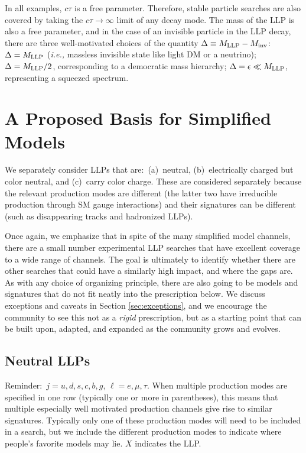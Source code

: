 In all examples, $c\tau$ is a free parameter. Therefore, stable particle searches are also covered by taking the $c\tau\rightarrow\infty$ limit of any decay mode. The mass of the LLP is also a free parameter, and in the case of an invisible particle in the LLP decay, there are three well-motivated choices of the quantity $\Delta\equiv M_{\rm LLP}-M_{\rm inv}$:~$\Delta=M_{\rm LLP}$ (\emph{i.e.,} massless invisible state like light DM or a neutrino); $\Delta=M_{\rm LLP}/2$, corresponding to a democratic mass hierarchy; $\Delta=\epsilon \ll M_{\rm LLP}$, representing a squeezed spectrum.

\section{A Proposed Basis for Simplified Models}

We separately consider LLPs that are:~(a)~neutral, (b)~electrically charged but color neutral, and (c)~carry color charge. These are considered separately because the relevant production modes are different (the latter two have irreducible production through SM gauge interactions) and their signatures can be different (such as disappearing tracks and hadronized LLPs).

Once again, we emphasize that in spite of the many simplified model channels, there are a small number experimental LLP searches that have excellent coverage to a wide range of channels. The goal is ultimately to identify whether there are other searches that could have a similarly high impact, and where the gaps are. As with any choice of organizing principle, there are also going to be models and signatures that do not fit neatly into the prescription below. We discuss exceptions and caveats in Section \ref{sec:exceptions}, and we encourage the community to see this not as a \emph{rigid} prescription, but as a starting point that can be built upon, adapted, and expanded as the community grows and evolves.

\subsection{Neutral LLPs}

Reminder:~$j=u,d,s,c,b,g$, $\ell=e,\mu,\tau$.
When multiple production modes are specified in one row (typically one or more in parentheses), this means that multiple especially well motivated production channels give rise to similar signatures. Typically only one of these production modes will need to be included in a search, but we include the different production modes to indicate where people's favorite models may lie. $X$ indicates the LLP.

